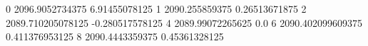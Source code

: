 0 2096.9052734375 6.91455078125
1 2090.255859375 0.26513671875
2 2089.710205078125 -0.280517578125
4 2089.99072265625 0.0
6 2090.402099609375 0.411376953125
8 2090.4443359375 0.45361328125
